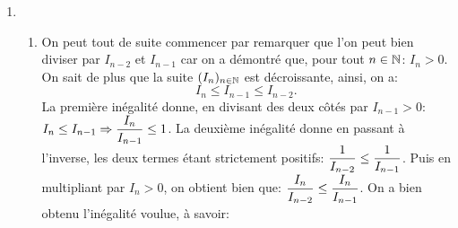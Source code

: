 \documentclass[a4paper, 11pt,reqno]{article}
\begin{document}
\begin{correction}
\begin{enumerate}
\begin{enumerate}
			      \item Ici il faut utiliser les deux formules d\'emontr\'ees pr\'ecedemment en distinguant deux cas: $n$ pair et $n$ impair:
			            \begin{itemize}
				            \item[$\bullet$] Cas $n$ pair: $n=2p$:\\
				                  \noindent On obtient:
				                  $$nI_nI_{n-1}=(2p)I_{2p}I_{2p-1}=2p\times \ddp\frac{1\times 3\times 5\times \dots\times (2p-1)}{2\times 4\times 6\times\dots\times (2p)}\times \ddp\frac{\pi}{2} \times
					                  \ddp\frac{2\times 4\times 6\times \dots\times (2p-2)}{1\times 3\times 5\times\dots\times (2p-1)}=(2p)\times \ddp\frac{1}{2p}\times  \ddp\frac{\pi}{2}.$$
				                  Ainsi, on a: $nI_nI_{n-1} =\ddp\frac{\pi}{2}$ dans le cas $n$ pair.
				            \item[$\bullet$] Cas $n$ impair: $n=2p+1$:\\
				                  \noindent On obtient
				                  $$\begin{array}{lll} nI_nI_{n-1}=(2p+1)I_{2p+1}I_{2p} & = & (2p+1) \times
             \ddp\frac{2\times 4\times 6\times \dots\times (2p)}{1\times 3\times 5\times\dots\times (2p+1)} \ddp\frac{1\times 3\times 5\times \dots\times (2p-1)}{2\times 4\times 6\times\dots\times (2p)}\times \ddp\frac{\pi}{2}\vsec \\ &=&(2p+1)\times \ddp\frac{1}{2p+1}\times  \ddp\frac{\pi}{2}.\end{array}$$
				                  Ainsi, on a: $nI_nI_{n-1} =\ddp\frac{\pi}{2}$ dans le cas $n$ impair.
			            \end{itemize}
			            Ainsi, dans tous les cas, on obtient que: $nI_nI_{n-1}= \ddp\frac{\pi}{2}$.
		      \end{enumerate}
		\item
		      \begin{enumerate}
			      \item On peut tout de suite commencer par remarquer que l'on peut bien diviser par $I_{n-2}$ et $I_{n-1}$ car on a d\'emontr\'e que, pour tout $n\in\mathbb{N}$: $I_n>0$.\\
			            \noindent On sait de plus que la suite $(I_n)_{n\in\mathbb{N}}$ est d\'ecroissante, ainsi, on a:
			            $$I_{n}\leq I_{n-1}\leq I_{n-2}.$$
			            La premi\`ere in\'egalit\'e donne, en divisant des deux c\^ot\'es par $I_{n-1}>0$: $I_{n}\leq I_{n-1}\Rightarrow \displaystyle\frac{I_n}{I_{n-1}}\leq 1$. La deuxi\`eme in\'egalit\'e donne en passant \`a l'inverse, les deux termes \'etant strictement positifs: $\displaystyle\frac{1}{I_{n-2}}\leq \displaystyle\frac{1}{I_{n-1}}$. Puis en multipliant par $I_n>0$, on obtient bien que: $\displaystyle\frac{I_n}{I_{n-2}}\leq \displaystyle\frac{I_n}{I_{n-1}}$. On a bien obtenu l'in\'egalit\'e voulue, \`a savoir:

\end{enumerate}
\end{enumerate}
\end{correction}
\end{document}
